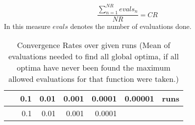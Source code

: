\documentclass[12pt,a4paper]{article}
\begin{document}
\[\frac{\sum\nolimits_{n=1}^{NR} evals_{n}}{NR} = CR\] In this measure
\(evals\) denotes the number of evaluations done. \newline

\begin{longtable}[c]{@{}crrrrrr@{}}
\caption{Convergence Rates over given runs (Mean of evaluations needed
to find all global optima, if all optima have never been found the
maximum allowed evaluations for that function were
taken.)}\tabularnewline
\toprule
\begin{minipage}[b]{0.11\columnwidth}\centering\strut
~
\strut\end{minipage} &
\begin{minipage}[b]{0.08\columnwidth}\raggedleft\strut
0.1
\strut\end{minipage} &
\begin{minipage}[b]{0.08\columnwidth}\raggedleft\strut
0.01
\strut\end{minipage} &
\begin{minipage}[b]{0.09\columnwidth}\raggedleft\strut
0.001
\strut\end{minipage} &
\begin{minipage}[b]{0.10\columnwidth}\raggedleft\strut
0.0001
\strut\end{minipage} &
\begin{minipage}[b]{0.11\columnwidth}\raggedleft\strut
0.00001
\strut\end{minipage} &
\begin{minipage}[b]{0.07\columnwidth}\raggedleft\strut
runs
\strut\end{minipage}\tabularnewline
\midrule
\endfirsthead
\toprule
\begin{minipage}[b]{0.11\columnwidth}\centering\strut
~
\strut\end{minipage} &
\begin{minipage}[b]{0.08\columnwidth}\raggedleft\strut
0.1
\strut\end{minipage} &
\begin{minipage}[b]{0.08\columnwidth}\raggedleft\strut
0.01
\strut\end{minipage} &
\begin{minipage}[b]{0.09\columnwidth}\raggedleft\strut
0.001
\strut\end{minipage} &
\begin{minipage}[b]{0.10\columnwidth}\raggedleft\strut
0.0001
\strut\end{minipage} &
\begin{minipage}[b]{0.11\columnwidth}\raggedleft\strut

\end{minipage}
\end{longtable}
\end{document}
